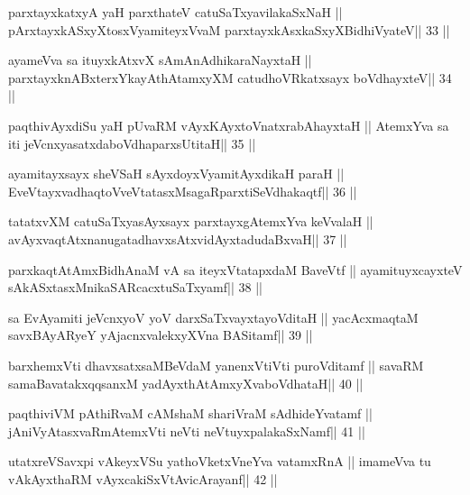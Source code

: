 \begin{shl}
parxtayxkatxyA yaH parxthateV catuSaTxyavilakaSxNaH ||
pArxtayxkASxyXtosxV\s yamiteyxVvaM parxtayxkAsxkaSxyXBidhiVyateV\hfill || 33 ||
\end{shl}

\begin{shl}
ayameVva sa ituyxkAtxvX sAmAnAdhikaraNayxtaH ||
parxtayxknABxterxYkayAthAtamxyXM catudhoVRkatxsayx boVdhayxteV\hfill || 34 ||
\end{shl}

\begin{shl}
paqthivAyxdiSu yaH pUvaRM vAyxKAyxtoV\s natxrabAhayxtaH ||
AtemxYva sa iti jeVcnxyasatxdaboVdhaparxsUtitaH\hfill || 35 ||
\end{shl}

\begin{shl}
ayamitayxsayx sheVSaH sAyxdoyxV\s yamitAyxdikaH paraH ||
EveVtayxvadhaqtoVveVtatasxMsagaRparxtiSeVdhakaqtf\hfill || 36 ||
\end{shl}

\begin{shl}
tatatxvXM catuSaTxyasAyxsayx parxtayxgAtemxYva keVvalaH ||
avAyxvaqtAtxnanugatadhavxsAtxvidAyxtadudaBxvaH\hfill || 37 ||
\end{shl}

\begin{shl}
parxkaqtAtAmxBidhAnaM vA sa iteyxVtatapxdaM BaveVtf ||
ayamituyxcayxteV sAkASxtasxMnikaSARcacxtuSaTxyamf\hfill || 38 ||
\end{shl}

\begin{shl}
sa EvAyamiti jeVcnxyoV yoV darxSaTxvayxtayoVditaH ||
yacAcxmaqtaM savxBAyARyeY yAjacnxvalekxyXVna BASitamf\hfill || 39 ||
\end{shl}

\begin{shl}
barxhemxVti dhavxsatxsaMBeVdaM yanenxVtiVti puroVditamf ||
savaRM samaBavatakxqqsanxM yadAyxthAtAmxyXvaboVdhataH\hfill || 40 ||
\end{shl}

\begin{shl}
paqthiviVM pAthiRvaM cAMshaM shariVraM sAdhideYvatamf ||
jAniVyAtasxvaRmAtemxVti neVti neVtuyxpalakaSxNamf\hfill || 41 ||
\end{shl}

\begin{shl}
utatxreVSavxpi vAkeyxVSu yathoVketxVneYva vatamxRnA ||
imameVva tu vAkAyxthaRM vAyxcakiSxVtAvicArayanf\hfill || 42 ||
\end{shl}

